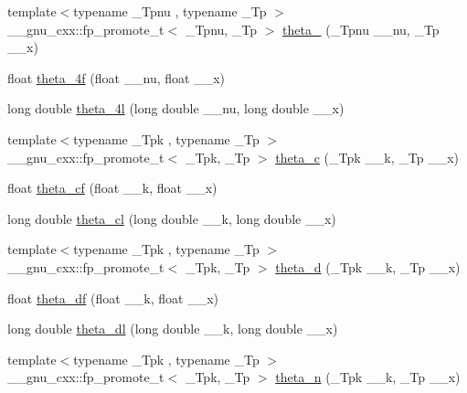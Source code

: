 \begin{DoxyCompactItemize}
\item 
{\footnotesize template$<$typename \+\_\+\+Tpnu , typename \+\_\+\+Tp $>$ }\\\+\_\+\+\_\+gnu\+\_\+cxx\+::fp\+\_\+promote\+\_\+t$<$ \+\_\+\+Tpnu, \+\_\+\+Tp $>$ \hyperlink{group__mathsf__gnu_ga8a6f8b69272a9f205a13e1745832ada3}{theta\+\_} (\+\_\+\+Tpnu \+\_\+\+\_\+nu, \+\_\+\+Tp \+\_\+\+\_\+x)
\item 
float \hyperlink{group__mathsf__gnu_ga0c5cbf87e304844ed4c3423be5ca09a5}{theta\+\_\+4f} (float \+\_\+\+\_\+nu, float \+\_\+\+\_\+x)
\item 
long double \hyperlink{group__mathsf__gnu_gaaf63a80e90cdcdd66ebb18cd3a84afae}{theta\+\_\+4l} (long double \+\_\+\+\_\+nu, long double \+\_\+\+\_\+x)
\item 
{\footnotesize template$<$typename \+\_\+\+Tpk , typename \+\_\+\+Tp $>$ }\\\+\_\+\+\_\+gnu\+\_\+cxx\+::fp\+\_\+promote\+\_\+t$<$ \+\_\+\+Tpk, \+\_\+\+Tp $>$ \hyperlink{group__mathsf__gnu_ga3ebbb6513c39e1d55b08cba7d169ce3d}{theta\+\_\+c} (\+\_\+\+Tpk \+\_\+\+\_\+k, \+\_\+\+Tp \+\_\+\+\_\+x)
\item 
float \hyperlink{group__mathsf__gnu_ga409f898afeaad5e25726ad552cfe6946}{theta\+\_\+cf} (float \+\_\+\+\_\+k, float \+\_\+\+\_\+x)
\item 
long double \hyperlink{group__mathsf__gnu_ga0531098c628999cf396217ff997cfdda}{theta\+\_\+cl} (long double \+\_\+\+\_\+k, long double \+\_\+\+\_\+x)
\item 
{\footnotesize template$<$typename \+\_\+\+Tpk , typename \+\_\+\+Tp $>$ }\\\+\_\+\+\_\+gnu\+\_\+cxx\+::fp\+\_\+promote\+\_\+t$<$ \+\_\+\+Tpk, \+\_\+\+Tp $>$ \hyperlink{group__mathsf__gnu_ga258edb995137d9e6344b3cd750266d74}{theta\+\_\+d} (\+\_\+\+Tpk \+\_\+\+\_\+k, \+\_\+\+Tp \+\_\+\+\_\+x)
\item 
float \hyperlink{group__mathsf__gnu_gad2dc6fcaf54d25cbfaad082623941118}{theta\+\_\+df} (float \+\_\+\+\_\+k, float \+\_\+\+\_\+x)
\item 
long double \hyperlink{group__mathsf__gnu_gacce4474168b9638ebeaad1c7b351fa04}{theta\+\_\+dl} (long double \+\_\+\+\_\+k, long double \+\_\+\+\_\+x)
\item 
{\footnotesize template$<$typename \+\_\+\+Tpk , typename \+\_\+\+Tp $>$ }\\\+\_\+\+\_\+gnu\+\_\+cxx\+::fp\+\_\+promote\+\_\+t$<$ \+\_\+\+Tpk, \+\_\+\+Tp $>$ \hyperlink{group__mathsf__gnu_ga202778bd650e04e9f3729bfca35c32e2}{theta\+\_\+n} (\+\_\+\+Tpk \+\_\+\+\_\+k, \+\_\+\+Tp \+\_\+\+\_\+x)

\end{DoxyCompactItemize}
